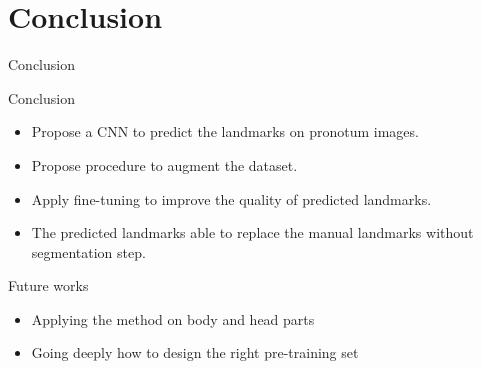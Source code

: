 \documentclass[10pt,svgnames]{beamer}
\begin{document}
\section{Conclusion}
\begin{frame}{Conclusion}
	\begin{block}{Conclusion}
		\small{
			\begin{itemize}
				\item Propose a CNN to predict the landmarks on pronotum images.
				\item Propose procedure to augment the dataset.
				\item Apply fine-tuning to improve the quality of predicted landmarks.
				\item The predicted landmarks able to replace the manual landmarks without segmentation step.
			\end{itemize}
		}
	\end{block}
	\pause
	\begin{block}{Future works}
		\small{
			\begin{itemize}
				\item Applying the method on body and head parts 
				\item Going deeply how to design the right pre-training set
			\end{itemize}					
			}
	\end{block}
\end{frame}

{\1
\begin{frame}
\end{frame}}
\end{document}
